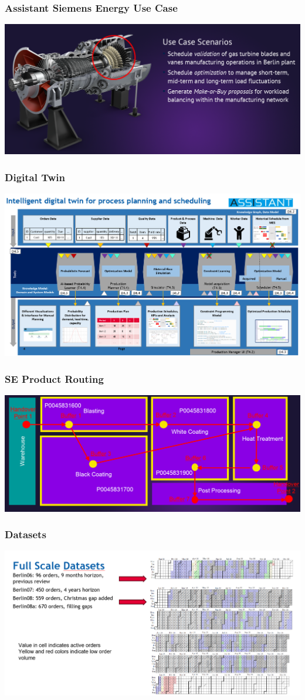 \documentclass[dvipsnames,aspectratio=169]{beamer}
\begin{document}
\begin{frame}
\frametitle{Assistant Siemens Energy Use Case}
\includegraphics[width=\textwidth]{images/assistantgasturbine}
\end{frame}

\begin{frame}
\frametitle{Digital Twin}
\includegraphics[width=.9\textwidth]{images/assistantdigitaltwin}
\end{frame}

\begin{frame}
\frametitle{SE Product Routing}
\includegraphics[width=\textwidth]{images/assistantrouting}
\end{frame}

\begin{frame}
\frametitle{Datasets}
\includegraphics[width=\textwidth]{images/assistantfullscaledatasets}
\end{frame}
\end{document}
